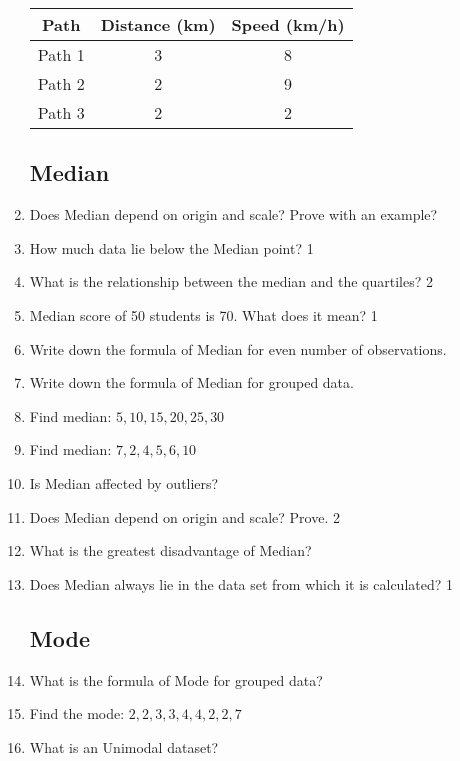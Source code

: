 \documentclass[a4paper,oneside]{book}
\begin{document}
\begin{enumerate}
    \begin{table}[h]
    \centering
\begin{tabular}{c|c|c}
Path   & Distance (km) & Speed (km/h) \\ \hline
Path 1 & 3             & 8            \\ \hline 
Path 2 & 2             & 9            \\ \hline
Path 3 & 2             & 2           
\end{tabular}
\end{table}

\subsection{Median}

    \item Does Median depend on origin and scale? Prove with an example?
    \item How much data lie below the Median point? \hfill 1
    \item What is the relationship between the median and the quartiles? \hfill 2
    \item Median score of 50 students is 70. What does it mean? \hfill 1
    \item Write down the formula of Median for even number of observations.
    \item Write down the formula of Median for grouped data.
    \item Find median: $5,10, 15, 20, 25, 30$
    \item Find median: $7,  2,  4,  5,  6, 10$
    \item Is Median affected by outliers?
    \item Does Median depend on origin and scale? Prove. \hfill 2
    \item What is the greatest disadvantage of Median?
    \item Does Median always lie in the data set from which it is calculated? \hfill 1
    
\subsection{Mode}

    \item What is the formula of Mode for grouped data?
    \item Find the mode: $2,2,3,3,4,4,2,2,7$
    \item What is an Unimodal dataset?


\end{enumerate}
\end{document}
